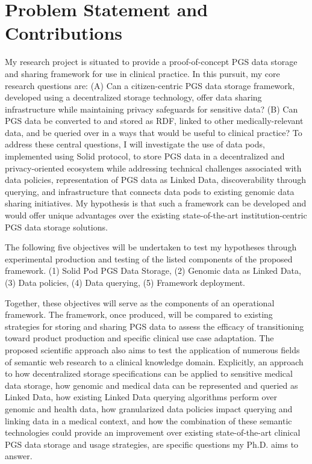 \documentclass[runningheads]{llncs}
\begin{document}
\section{Problem Statement and Contributions}

My research project is situated to provide a proof-of-concept PGS data storage and sharing framework for use in clinical practice. 
In this pursuit, my core research questions are: 
(A) Can a citizen-centric PGS data storage framework, developed using a decentralized storage technology, offer data sharing infrastructure while maintaining privacy safeguards for sensitive data? 
(B) Can PGS data be converted to and stored as RDF, linked to other medically-relevant data, and be queried over in a ways that would be useful to clinical practice?
To address these central questions, I will investigate the use of data pods, implemented using Solid protocol, to store PGS data in a decentralized and privacy-oriented ecosystem while addressing technical challenges associated with data policies, representation of PGS data as Linked Data, discoverability through querying, and infrastructure that connects data pods to existing genomic data sharing initiatives. 
My hypothesis is that such a framework can be developed and would offer unique advantages over the existing state-of-the-art institution-centric PGS data storage solutions. 

The following five objectives will be undertaken to test my hypotheses through experimental production and testing of the listed components of the proposed framework.
(1) Solid Pod PGS Data Storage, 
(2) Genomic data as Linked Data,
(3) Data policies,
(4) Data querying,
(5) Framework deployment.

Together, these objectives will serve as the components of an operational framework. 
The framework, once produced, will be compared to existing strategies for storing and sharing PGS data to assess the efficacy of transitioning toward product production and specific clinical use case adaptation.
The proposed scientific approach also aims to test the application of numerous fields of semantic web research to a clinical knowledge domain. 
Explicitly, an approach to how decentralized storage specifications can be applied to sensitive medical data storage, how genomic and medical data can be represented and queried as Linked Data, how existing Linked Data querying algorithms perform over genomic and health data, how granularized data policies impact querying and linking data in a medical context, and how the combination of these semantic technologies could provide an improvement over existing state-of-the-art clinical PGS data storage and usage strategies, are specific questions my Ph.D. aims to answer.
\end{document}
